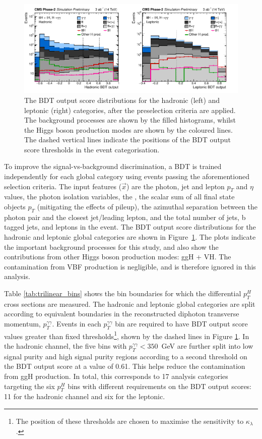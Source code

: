 \begin{figure}[htb!]
  \centering
  \includegraphics[width=1\textwidth]{Figures/cms/trilinear/CMS-PAS-FTR-18-020_Figure_002.pdf}
  \caption[BDT output score distributions for the HL-LHC sensitivity study]
  {
    The BDT output score distributions for the hadronic (left) and leptonic (right) categories, after the preselection criteria are applied. The background processes are shown by the filled histograms, whilst the Higgs boson production modes are shown by the coloured lines. The dashed vertical lines indicate the positions of the BDT output score thresholds in the event categorisation.
  }
  \label{fig:trilinear_bdt}
\end{figure}

To improve the signal-vs-background discrimination, a BDT is trained independently for each global category using events passing the aforementioned selection criteria. The input features ($\vec{x}$) are the photon, jet and lepton $p_T$ and $\eta$ values, the photon isolation variables, the \met, the scalar sum of all final state objects $p_T$ (mitigating the effects of pileup), the azimuthal separation between the photon pair and the closest jet/leading lepton, and the total number of jets, b tagged jets, and leptons in the event. The BDT output score distributions for the hadronic and leptonic global categories are shown in Figure~\ref{fig:trilinear_bdt}. The plots indicate the important background processes for this study, and also show the contributions from other Higgs boson production modes: ggH + VH. The contamination from VBF production is negligible, and is therefore ignored in this analysis.

Table \ref{tab:trilinear_bins} shows the bin boundaries for which the differential $p_T^H$ cross sections are measured. The hadronic and leptonic global categories are split according to equivalent boundaries in the reconstructed diphoton transverse momentum, $p_T^{\gamma\gamma}$. Events in each $p_T^{\gamma\gamma}$ bin are required to have BDT output score values greater than fixed thresholds\footnote{The position of these thresholds are chosen to maximise the sensitivity to $\kappa_\lambda$.}, shown by the dashed lines in Figure \ref{fig:trilinear_bdt}. In the hadronic channel, the five bins with $p_T^{\gamma\gamma}<350$~GeV are further split into low signal purity and high signal purity regions according to a second threshold on the BDT output score at a value of 0.61. This helps reduce the contamination from ggH production. In total, this corresponds to 17 analysis categories targeting the six $p_T^H$ bins with different requirements on the BDT output scores: 11 for the hadronic channel and six for the leptonic.

